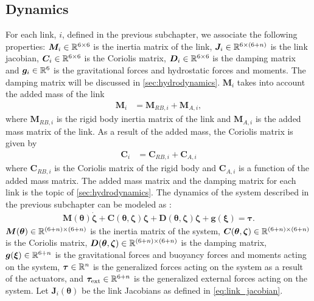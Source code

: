 \fi %


\subsection{Dynamics}

For each link, $i$, defined in the previous subchapter, we associate the following
properties: $\bm{M}_i \in \mathbb{R}^{6 \times 6}$ is the inertia matrix of the link,
$\bm{J}_i \in \mathbb{R}^{6 \times (6+n)}$ is the link jacobian, $\bm{C}_i \in \mathbb{R}^{6 \times 6}$
is the Coriolis matrix, $\bm{D}_i \in \mathbb{R}^{6 \times 6}$ is the damping matrix and
$\bm{g}_i \in \mathbb{R}^{6}$ is the gravitational forces and hydrostatic forces and moments.
The damping matrix will be discussed in \autoref{sec:hydrodynamics}.
$\bm{M}_i$ takes into account the added mass of the link
\begin{align}
    \bm{M}_i &= \bm{M}_{RB,i} + \bm{M}_{A,i},
\end{align}
where $\bm{M}_{RB,i}$ is the rigid body inertia matrix of the link and $\bm{M}_{A,i}$
is the added mass matrix of the link. As a result of the added mass, the Coriolis
matrix is given by
\begin{align}
    \bm{C}_i &= \bm{C}_{RB,i} + \bm{C}_{A,i}
\end{align}
where $\bm{C}_{RB,i}$ is the Coriolis matrix of the rigid body and $\bm{C}_{A,i}$
is a function of the added mass matrix. The added mass matrix and the damping matrix
for each link is the topic of \autoref{sec:hydrodynamics}. The dynamics of the
system described in the previous subchapter can be modeled as
\cite{from2014}:
\begin{align}
    \bm{M}(\bm{\theta})\dot{\bm{\zeta}} +
        \bm{C}(\bm{\theta}, \bm{\zeta}) \bm{\zeta} +
        \bm{D}(\bm{\theta}, \bm{\zeta}) \bm{\zeta} +
        \bm{g}(\bm{\xi}) =
        \bm{\tau}. \label{eq:robot_dynamics}
\end{align}
$\bm{M}(\bm{\theta}) \in \mathbb{R}^{(6+n)\times(6+n)}$  is the inertia matrix of the
system, $\bm{C}(\bm{\theta}, \bm{\zeta}) \in \mathbb{R}^{(6+n)\times(6+n)}$ is the
Coriolis matrix, $\bm{D}(\bm{\theta}, \bm{\zeta}) \in \mathbb{R}^{(6+n)\times(6+n)}$ is
the damping matrix, $\bm{g}(\bm{\xi}) \in \mathbb{R}^{6+n}$ is the gravitational forces
and buoyancy forces and moments acting on the system, $\bm{\tau} \in \mathbb{R}^{n}$ is the generalized
forces acting on the system as a result of the actuators,
and $\bm{\tau}_{\mathrm{ext}} \in \mathbb{R}^{6+n}$ is the
generalized external forces acting on the system. Let $\bm{J}_{i}(\bm{\theta})$
be the link Jacobians as defined in \autoref{eq:link_jacobian}.
